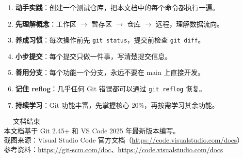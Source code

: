\documentclass[12pt,a4paper,openany]{ctexbook}
\begin{document}
\begin{center}
\begin{tcolorbox}[
  colback=gitorange!5!white,
  colframe=gitorange!70!black,
  title={\faGraduationCap\; 学习建议},
  fonttitle=\bfseries\large
]
\begin{enumerate}[leftmargin=1.5em]
  \item \textbf{动手实践}：创建一个测试仓库，把本文档中的每个命令都执行一遍。
  \item \textbf{先理解概念}：工作区 $\to$ 暂存区 $\to$ 仓库 $\to$ 远程，理解数据流向。
  \item \textbf{养成习惯}：每次操作前先 \texttt{git status}，提交前检查 \texttt{git diff}。
  \item \textbf{小步提交}：每个提交只做一件事，写清楚提交信息。
  \item \textbf{善用分支}：每个功能一个分支，永远不要在 main 上直接开发。
  \item \textbf{记住 reflog}：几乎任何 Git 错误都可以通过 \texttt{git reflog} 恢复。
  \item \textbf{持续学习}：Git 功能丰富，先掌握核心 20\%，再按需学习其余功能。
\end{enumerate}
\end{tcolorbox}
\end{center}

\vfill

\begin{center}
\large\color{gray}
--- 文档结束 ---\\[0.5em]
\normalsize
本文档基于 Git 2.45+ 和 VS Code 2025 年最新版本编写。\\
截图来源：Visual Studio Code 官方文档（\url{https://code.visualstudio.com/docs}）\\
参考资料：\url{https://git-scm.com/doc}、\url{https://code.visualstudio.com/docs}
\end{center}
\end{document}
